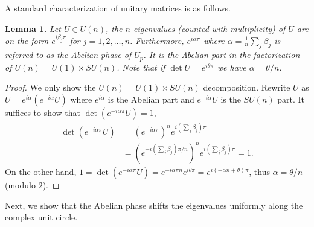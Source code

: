\documentclass[a4paper,10pt,oneside]{book}
\theoremstyle{plain}
\newtheorem{lemma}[theorem]{Lemma}
\theoremstyle{definition}
\theoremstyle{remark}
\DeclarePairedDelimiter\abs{\lvert}{\rvert}
\begin{document}



A standard characterization of unitary matrices is as follows.

\begin{lemma}
  Let $U \in U(n)$, the $n$ eigenvalues (counted with multiplicity) of $U$ are on the form $e^{i\beta_jπ}$ for $j = 1,2,\ldots,n$. Furthermore, $e^{i\alpha\pi}$ where $\alpha = \frac{1}{n}\sum_j \beta_j$ is referred to as the Abelian phase of $U_p$. It is the Abelian part in the factorization of $U(n) = U(1) \times SU(n)$. Note that if $\det U = e^{iθπ}$ we have $α = θ/n$.
\end{lemma}

\begin{proof}
  We only show the $U(n) = U(1) \times SU(n)$ decomposition.
  Rewrite $U$ as $U = e^{i\alpha}\left( e^{-i\alpha} U \right)$ where $e^{i\alpha}$ is the Abelian part and $e^{-i\alpha} U$ is the $SU(n)$ part. It suffices to show that $\det \left( e^{-iαπ} U \right) = 1$,
  \begin{align*}
    \det \left( e^{-iαπ} U \right)
    &= \left(e^{-iαπ}\right)^n e^{i\left(\sum_j \beta_j\right)π} \\
    &= \left(e^{-i\left(\sum_j \beta_j\right)π/n}\right)^n e^{i\left(\sum_j \beta_j\right)π} = 1.
  \end{align*}
  On the other hand, $1 = \det \left( e^{-iαπ} U \right) = e^{-iαπn} e^{iθπ} = e^{i(-αn+θ)π}$, thus $α = θ/n$ (modulo $2$).
\end{proof}

Next, we show that the Abelian phase shifts the eigenvalues uniformly along the complex unit circle.
\end{document}
